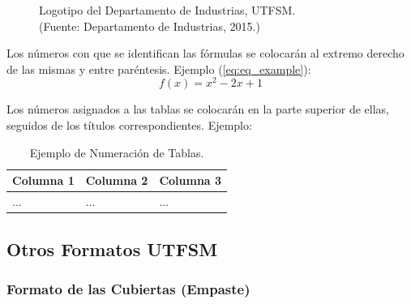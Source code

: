 \begin{description}
\begin{figure}[ht!]
	\caption[Logotipo del Departamento de Industrias, UTFSM.]{Logotipo del Departamento de Industrias, UTFSM.\\
	{\footnotesize (Fuente: Departamento de Industrias, 2015.)}}
	
	\label{fig:figure_example}
	\end{figure}

Los números con que se identifican las fórmulas se colocarán al extremo derecho de las mismas y entre paréntesis. Ejemplo (\autoref{eq:eq_example}):
\begin{equation}
f(x) = x^2-2x+1
\label{eq:eq_example}
\end{equation}

Los números asignados a las tablas se colocarán en la parte superior de ellas, seguidos de los títulos correspondientes. Ejemplo:

\begin{table}[ht]
\centering
\caption{Ejemplo de Numeración de Tablas.}
\begin{tabular}{p{3cm}|p{3cm}|p{3cm}}
\hline
\textbf{Columna 1} & \textbf{Columna 2} & \textbf{Columna 3} \\
\hline\hline
... & ... & ... \\
\hline
\end{tabular}
\end{table}

\end{description}

\subsection{Otros Formatos UTFSM}
\subsubsection{Formato de las Cubiertas (Empaste)}


